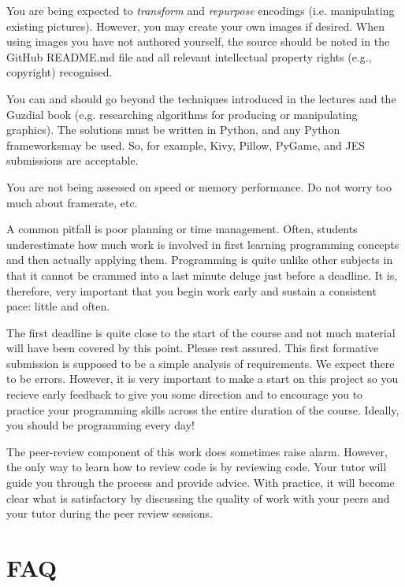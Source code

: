 \documentclass{../../fal_assignment}
\begin{document}
You are being expected to \textit{transform} and \textit{repurpose} encodings (i.e. manipulating existing pictures). However, you may create your own images if desired. When using images you have not authored yourself, the source should be noted in the GitHub README.md file and all relevant intellectual property rights (e.g., copyright) recognised. 

You can and should go beyond the techniques introduced in the lectures and the Guzdial book (e.g. researching algorithms for producing or manipulating graphics). The solutions must be written in Python, and any Python frameworksmay be used. So, for example, Kivy, Pillow, PyGame, and JES submissions are acceptable.

You are not being assessed on speed or memory performance. Do not worry too much about framerate, etc.

A common pitfall is poor planning or time management. Often, students underestimate how much work is involved in first learning programming concepts and then actually applying them. Programming is quite unlike other subjects in that it cannot be crammed into a last minute deluge just before a deadline. It is, therefore, very important that you begin work early and sustain a consistent pace: little and often.

The first deadline is quite close to the start of the course and not much material will have been covered by this point. Please rest assured. This first formative submission is supposed to be a simple analysis of requirements. We expect there to be errors. However, it is very important to make a start on this project so you recieve early feedback to give you some direction and to encourage you to practice your programming skills across the entire duration of the course. Ideally, you should be programming every day!

The peer-review component of this work does sometimes raise alarm. However, the only way to learn how to review code is by reviewing code. Your tutor will guide you through the process and provide advice. With practice, it will become clear what is satisfactory by discussing the quality of work with your peers and your tutor during the peer review sessions. 

\section*{FAQ}
\end{document}
